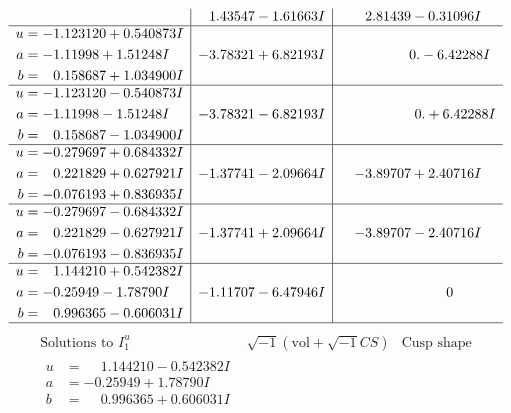 \documentclass[1p]{elsarticle_modified}
\theoremstyle{definition}
\newcommand{\I}{\sqrt{-1}}
\begin{document}
$$\begin{array}{c|c|c}
 & \phantom{-}1.43547 - 1.61663 I & \phantom{-}2.81439 - 0.31096 I \\ \hline\begin{aligned}
u &= -1.123120 + 0.540873 I \\
a &= -1.11998 + 1.51248 I \\
b &= \phantom{-}0.158687 + 1.034900 I\end{aligned}
 & -3.78321 + 6.82193 I & \phantom{-0.000000 } 0. - 6.42288 I \\ \hline\begin{aligned}
u &= -1.123120 - 0.540873 I \\
a &= -1.11998 - 1.51248 I \\
b &= \phantom{-}0.158687 - 1.034900 I\end{aligned}
 & -3.78321 - 6.82193 I & \phantom{-0.000000 -}0. + 6.42288 I \\ \hline\begin{aligned}
u &= -0.279697 + 0.684332 I \\
a &= \phantom{-}0.221829 + 0.627921 I \\
b &= -0.076193 + 0.836935 I\end{aligned}
 & -1.37741 - 2.09664 I & -3.89707 + 2.40716 I \\ \hline\begin{aligned}
u &= -0.279697 - 0.684332 I \\
a &= \phantom{-}0.221829 - 0.627921 I \\
b &= -0.076193 - 0.836935 I\end{aligned}
 & -1.37741 + 2.09664 I & -3.89707 - 2.40716 I \\ \hline\begin{aligned}
u &= \phantom{-}1.144210 + 0.542382 I \\
a &= -0.25949 - 1.78790 I \\
b &= \phantom{-}0.996365 - 0.606031 I\end{aligned}
 & -1.11707 - 6.47946 I & \phantom{-0.000000 } 0\\
 \hline 
 \end{array}$$\newpage$$\begin{array}{c|c|c}  
\text{Solutions to }I^u_{1}& \I (\text{vol} + \sqrt{-1}CS) & \text{Cusp shape}\\
 \hline 
\begin{aligned}
u &= \phantom{-}1.144210 - 0.542382 I \\
a &= -0.25949 + 1.78790 I \\
b &= \phantom{-}0.996365 + 0.606031 I\end{aligned}

\end{array}$$
\end{document}
